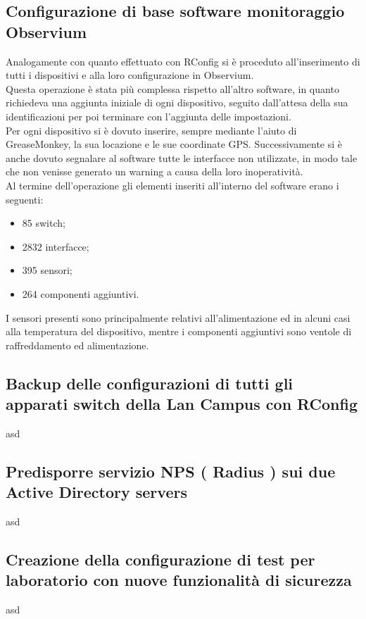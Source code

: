 \documentclass[Realizzazione.tex]{subfiles}
\begin{document}
\subsection{Configurazione di base software monitoraggio Observium}
Analogamente con quanto effettuato con RConfig si è proceduto all'inserimento di tutti i dispositivi e alla loro configurazione in Observium. \\
Questa operazione è stata più complessa rispetto all'altro software, in quanto richiedeva una aggiunta iniziale di ogni dispositivo, seguito dall'attesa della sua identificazioni per poi terminare con l'aggiunta delle impostazioni. \\
Per ogni dispositivo si è dovuto inserire, sempre mediante l'aiuto di GreaseMonkey, la sua locazione e le sue coordinate GPS. Successivamente si è anche dovuto segnalare al software tutte le interfacce non utilizzate, in modo tale che non venisse generato un warning a causa della loro inoperatività.\\

Al termine dell'operazione gli elementi inseriti all'interno del software erano i seguenti:
\begin{itemize}
	\item 85 switch;
	\item 2832 interfacce;
	\item 395 sensori;
	\item 264 componenti aggiuntivi.
\end{itemize}

I sensori presenti sono principalmente relativi all'alimentazione ed in alcuni casi alla temperatura del dispositivo, mentre i componenti aggiuntivi sono ventole di raffreddamento ed alimentazione. \\

\subsection{Backup delle configurazioni di tutti gli apparati switch della Lan Campus con RConfig} 
asd
\subsection{Predisporre servizio NPS ( Radius ) sui due Active Directory servers} 
asd
\subsection{Creazione della configurazione di test per laboratorio con nuove funzionalità di sicurezza} 
asd
\end{document}

